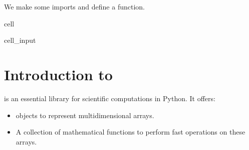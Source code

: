 \documentclass[letterpaper,10pt,english]{jupyterBook}
\begin{document}
\sphinxAtStartPar
We make some imports and define a  function.

\begin{sphinxuseclass}{cell}\begin{sphinxVerbatimInput}

\begin{sphinxuseclass}{cell_input}
\begin{sphinxVerbatim}[commandchars=\\\{\}]
  
 
      
       
           
               
           
              
\end{sphinxVerbatim}

\end{sphinxuseclass}\end{sphinxVerbatimInput}

\end{sphinxuseclass}

\section{Introduction to }
\label{\detokenize{01:introduction-to-numpy}}
\sphinxAtStartPar
{} is an essential library for scientific computations in Python. It offers:
\begin{itemize}
\item {} 
\sphinxAtStartPar
{} objects to represent multi\sphinxhyphen{}dimensional arrays.

\item {} 
\sphinxAtStartPar
A collection of mathematical functions to perform fast operations on these arrays.

\end{itemize}
\end{document}
